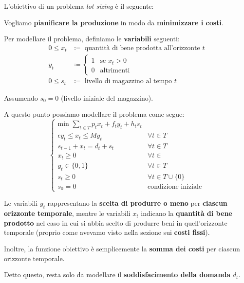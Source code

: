 L'obiettivo di un problema \textit{lot sizing} è il seguente:

\begin{exa}
    Vogliamo \textbf{pianificare la produzione} in modo da
    \textbf{minimizzare i costi}.
\end{exa}

Per modellare il problema, definiamo le \textbf{variabili} seguenti:
\[
    \begin{aligned}
        0 \le x_t &\coloneqq \text{ quantità di bene prodotta all'orizzonte } t \\ 
        y_t &\coloneqq  \begin{cases}
            1 & \text{se } x_t > 0 \\ 
            0 & \text{altrimenti}
        \end{cases} \\ 
            0 \le s_t &\coloneqq \text{ livello di magazzino al tempo } t
    \end{aligned}
\]

Assumendo $s_{0}=0$ (livello iniziale del magazzino).

A questo punto possiamo modellare il problema come segue:
\[
    \begin{cases}
        \displaystyle\text{min } \sum_{t\in T} p_t x_t + f_t y_t + h_t s_t \\ 
        \epsilon y_t \le x_t \le My_t & \forall t \in T \\
        s_{t-1} + x_t = d_t + s_t & \forall t \in T \\
        x_t \ge 0 & \forall t \in \\ 
        y_t \in \{0,1\} & \forall t\in T \\ 
        s_t \ge 0 & \forall t\in T \cup \{0\} \\ 
        s_0 = 0 & \text{condizione iniziale}
    \end{cases}
\]

Le variabili $y_t$ rappresentano la \textbf{scelta di produrre o meno} per
\textbf{ciascun orizzonte temporale}, mentre le variabili $x_t$ indicano
la \textbf{quantità di bene prodotto} nel caso in cui si abbia scelto
di produrre beni in quell'orizzonte temporale (proprio come avevamo visto
nella sezione sui \textbf{costi fissi}).

Inoltre, la funzione obiettivo è semplicemente la \textbf{somma dei costi} per 
ciascun orizzonte temporale.

Detto questo, resta solo da modellare il \textbf{soddisfacimento della domanda} $d_t$.

